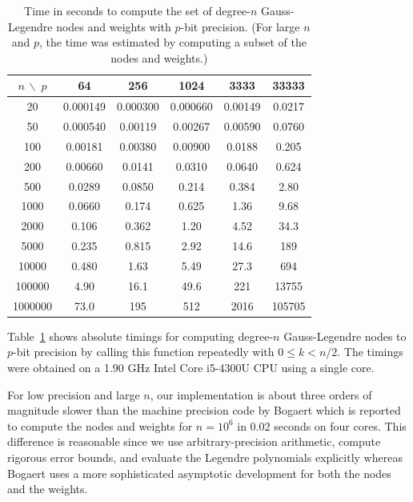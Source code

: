 \documentclass{siamart0216}
\begin{document}
\begin{table}[h!]
\begin{centering}
\begin{tabular}{ c | c c c c c }
$n\, \backslash \; p$ & 64 & 256 & 1024 & 3333 & 33333 \\ \hline
20  & 0.000149  &  0.000300  &  0.000660  &  0.00149  &  0.0217  \\ 
50  & 0.000540  &  0.00119  &  0.00267  &  0.00590  &  0.0760  \\ 
100  & 0.00181  &  0.00380  &  0.00900  &  0.0188  &  0.205  \\ 
200  & 0.00660  &  0.0141  &  0.0310  &  0.0640  &  0.624  \\ 
500  & 0.0289  &  0.0850  &  0.214  &  0.384  &  2.80  \\ 
1000  & 0.0660  &  0.174  &  0.625  &  1.36  &  9.68  \\ 
2000  & 0.106  &  0.362  &  1.20  &  4.52  &  34.3  \\ 
5000  & 0.235  &  0.815  &  2.92  &  14.6  &  189  \\ 
10000  & 0.480  &  1.63  &  5.49  &  27.3  &  694  \\ 
100000  & 4.90  &  16.1  &  49.6  &  221  &  13755  \\ 
1000000  & 73.0  &  195  &  512  &  2016  &  105705
\end{tabular}
\caption{Time in seconds to compute the set of degree-$n$ Gauss-Legendre nodes and weights with $p$-bit precision.
(For large $n$ and $p$, the time was estimated by computing a subset of the nodes and weights.)}
\label{tab:timings}
\end{centering}
\end{table}

Table~\ref{tab:timings} shows absolute timings for computing
degree-$n$ Gauss-Legendre nodes to $p$-bit precision
by calling this function repeatedly with $0 \le k < n / 2$.
The timings were obtained on a 1.90 GHz Intel Core i5-4300U CPU
using a single core.

For low precision and large $n$, our implementation
is about three orders of magnitude slower than the machine precision
code by Bogaert \cite{bogaert2014iteration}
which is reported to compute the nodes and weights for $n = 10^6$
in 0.02 seconds on four cores.
This difference is reasonable since we use arbitrary-precision arithmetic,
compute rigorous error bounds, and evaluate the Legendre polynomials
explicitly whereas Bogaert uses a more sophisticated
asymptotic development for both the nodes and the weights.
\end{document}
